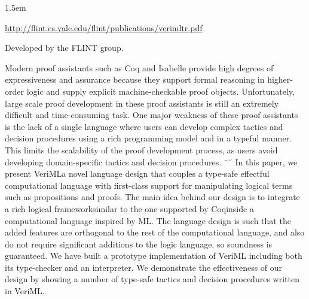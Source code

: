 \documentclass[12pt,twoside]{article}
\begin{document}
\begin{mddefinitions}

\begin{mdbmarginx}{}{}{}{1.5em}%
\begin{mddefdata}%
\href{http://flint.cs.yale.edu/flint/publications/verimltr.pdf}{{\ttfamily http://\hspace{0pt}flint.\hspace{0pt}cs.\hspace{0pt}yale.\hspace{0pt}edu/\hspace{0pt}flint/\hspace{0pt}publications/\hspace{0pt}verimltr.\hspace{0pt}pdf}}%
\end{mddefdata}%
\end{mdbmarginx}%
\end{mddefinitions}%

\noindent{}Developed by the FLINT group.%

Modern proof assistants such as Coq and Isabelle provide high degrees
of expressiveness and assurance because they support formal reasoning
in higher-order logic and supply explicit machine-checkable proof
objects. Unfortunately, large scale proof development in these proof
assistants is still an extremely difficult and time-consuming
task. One major weakness of these proof assistants is the lack of a
single language where users can develop complex tactics and decision
procedures using a rich programming model and in a typeful
manner. This limits the scalability of the proof development process,
as users avoid developing domain-specific tactics and decision
procedures.
¯˘
In this paper, we present VeriML\textemdash{}a novel language design that
couples a type-safe effectful computational language with first-class
support for manipulating logical terms such as propositions and
proofs. The main idea behind our design is to integrate a rich logical
framework\textemdash{}similar to the one supported by Coq\textemdash{}inside a
computational language inspired by ML. The language design is such
that the added features are orthogonal to the rest of the
computational language, and also do not require significant additions
to the logic language, so soundness is guaranteed. We have built a
prototype implementation of VeriML including both its type-checker and
an interpreter. We demonstrate the effectiveness of our design by
showing a number of type-safe tactics and decision procedures written
in VeriML.%
\end{document}
